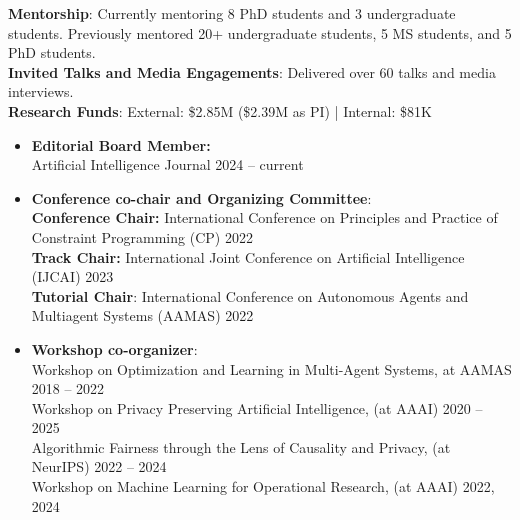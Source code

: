 \documentclass[localFont,alternative]{documentMETADATA}
\begin{document}
{\bf Mentorship}: Currently mentoring 8 PhD students and 3 undergraduate students. \hspace{20pt}
Previously mentored 20+ undergraduate students, 5 MS students, and 5 PhD students.\\
{\bf Invited Talks and Media Engagements}: Delivered over 60 talks and media interviews.\\
{\bf Research Funds}: External: \$2.85M (\$2.39M as PI) \hspace{4pt}|\hspace{4pt} Internal: \$81K


  \begin{itemize}
  	\item {\bf Editorial Board Member:}\\
  	Artificial Intelligence Journal \hfill{2024 -- current}
    \item {\bf Conference co-chair and Organizing Committee}:  \\
    {\bf Conference Chair:} International Conference on Principles and Practice of Constraint Programming (CP)  \hfill{2022}\\
    {\bf Track Chair:} International Joint Conference on Artificial Intelligence (IJCAI) \hfill{2023}\\
		{\bf Tutorial Chair}:  International Conference on Autonomous Agents and Multiagent Systems (AAMAS) \hfill{2022}
		
    \item {\bf Workshop co-organizer}: \\
    {Workshop on Optimization and Learning in Multi-Agent Systems, at AAMAS} \hfill{2018 -- 2022}\\
    {Workshop on Privacy Preserving Artificial Intelligence, (at AAAI)}   \hfill{2020 -- 2025}\\
    {Algorithmic Fairness through the Lens of Causality and Privacy, (at NeurIPS)} \hfill{2022 -- 2024}\\
    {Workshop on Machine Learning for Operational Research, (at AAAI)}   \hfill{2022, 2024}
    

\end{itemize}
\end{document}
